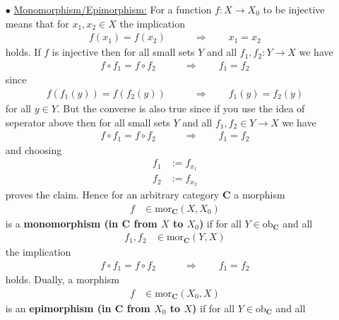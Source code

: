 \begin{exa}
\begin{enumerate}
\item[$\bullet$]
\underline{Monomorphism/Epimorphism:}
For a function $f \colon X \rightarrow X_{0}$ to be injective means that for $x_{1},x_{2} \in X$ the implication
\begin{align*}
  f(x_{1})
  =
  f(x_{2})
  \qquad
  &\Rightarrow
  \qquad
  x_{1}
  =
  x_{2}
\end{align*}
holds. If $f$ is injective then for all small sets $Y$ and all $f_{1},f_{2} \colon Y \rightarrow X$ we have
\begin{align*}
  f
  \circ
  f_{1}
  =
  f
  \circ
  f_{2}
  \qquad
  &\Rightarrow
  \qquad
  f_{1}
  =
  f_{2}
\end{align*}
since
\begin{align*}
  f
  \left(
    f_{1}(y)
  \right)
  =
  f
  \left(
    f_{2}(y)
  \right)
  \qquad
  &\Rightarrow
  \qquad
  f_{1}(y)
  =
  f_{2}(y)
\end{align*}
for all $y \in Y$. But the converse is also true since if you use the idea of seperator above then for all small sets $Y$ and all $f_{1},f_{2} \in Y \rightarrow X$ we have
\begin{align*}
  f
  \circ
  f_{1}
  =
  f
  \circ
  f_{2}
  \qquad
  &\Rightarrow
  \qquad
  f_{1}
  =
  f_{2}
\end{align*}
and choosing
\begin{align*}
  f_{1}
  &:=
  f_{x_{1}}
  \\
  f_{2}
  &:=
  f_{x_{2}}
\end{align*}
proves the claim. Hence for an arbitrary category $\mathbf{C}$ a morphism
\begin{align*}
  f
  &\in
  \mathrm{mor}_{\mathbf{C}}(X,X_{0})
\end{align*}
is a \textbf{monomorphism (in $\mathbf{C}$ from $X$ to $X_{0}$)} if for all $Y \in \mathrm{ob}_{\mathbf{C}}$ and all
\begin{align*}
  f_{1},
  f_{2}
  &\in
  \mathrm{mor}_{\mathbf{C}}(Y,X)
\end{align*}
the implication
\begin{align*}
  f
  \circ
  f_{1}
  =
  f
  \circ
  f_{2}
  \qquad
  &\Rightarrow
  \qquad
  f_{1}
  =
  f_{2}
\end{align*}
holds. Dually, a morphism
\begin{align*}
  f
  &\in
  \mathrm{mor}_{\mathbf{C}}(X_{0},X)
\end{align*}
is an \textbf{epimorphism (in $\mathbf{C}$ from $X_{0}$ to $X$)} if for all $Y \in \mathrm{ob}_{\mathbf{C}}$ and all
\begin{align*}

\end{align*}
\end{enumerate}
\end{exa}
